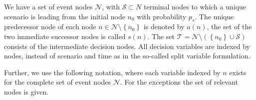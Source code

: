 \begin{figure}[htb]
{
\endpsmatrix}
\end{figure}

We have a set of event nodes $\mathcal{N}$, with $\mathcal{S}\subset {N}$ terminal nodes to which a unique scenario is leading from the initial node $n_0$ with probability $p_s$. The unique predecessor node of each node $n\in\mathcal{N}\setminus \left\{n_0\right\}$ is denoted by $a(n)$, the set of the two immediate successor nodes is called $s(n)$. The set $\mathcal{T}= \mathcal{N}\setminus\left(\left\{n_0\right\}\cup\mathcal{S}\right)$ consists of the intermediate decision nodes. All decision variables are indexed by nodes, instead of scenario and time as in the so-called split variable formulation.

Further, we use the following notation, where each variable indexed by $n$ exists for the complete set of event nodes $\mathcal{N}$. For the exceptions the set of relevant nodes is given.


